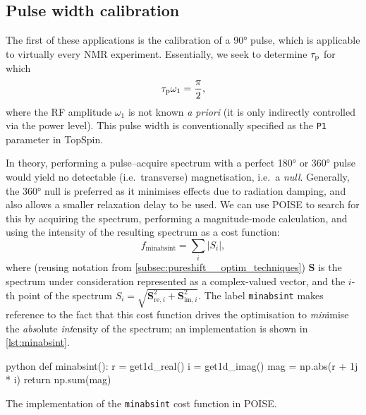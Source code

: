\subsection{Pulse width calibration}
\label{subsec:poise__pulsecal}

The first of these applications is the calibration of a \ang{90} \proton{} pulse, which is applicable to virtually every NMR experiment.
Essentially, we seek to determine $\tau_\mathrm{p}$ for which
\begin{equation}
    \label{eq:pw90}
    \tau_\mathrm{p} \omega_1 = \frac{\pi}{2},
\end{equation}
where the RF amplitude $\omega_1$ is not known \textit{a priori} (it is only indirectly controlled via the power level).
This pulse width is conventionally specified as the \texttt{P1} parameter in TopSpin.

In theory, performing a pulse--acquire spectrum with a perfect \ang{180} or \ang{360} pulse would yield no detectable (i.e.\ transverse) magnetisation, i.e.\ a \textit{null}.
Generally, the \ang{360} null is preferred as it minimises effects due to radiation damping, and also allows a smaller relaxation delay to be used.
We can use POISE to search for this by acquiring the spectrum, performing a magnitude-mode calculation, and using the intensity of the resulting spectrum as a cost function:
\begin{equation}
    \label{eq:minabsint}
    f_\mathrm{minabsint} = \sum_i |S_i|,
\end{equation}
where (reusing notation from \cref{subsec:pureshift__optim_techniques}) $\symbf{S}$ is the spectrum under consideration represented as a complex-valued vector, and the $i$-th point of the spectrum $S_i = \sqrt{\symbf{S}_{\text{re},i}^2 + \symbf{S}_{\text{im},i}^2}$.
The label \texttt{minabsint} makes reference to the fact that this cost function drives the optimisation to \textit{min}imise the \textit{abs}olute \textit{int}ensity of the spectrum; an implementation is shown in \cref{lst:minabsint}.

\begin{mylisting}[htb]
\begin{tcbminted}{python}
def minabsint():
    r = get1d_real()
    i = get1d_imag()
    mag = np.abs(r + 1j * i)
    return np.sum(mag)
\end{tcbminted}
\caption[\texttt{minabsint} cost function]{The implementation of the \texttt{minabsint} cost function in POISE.}
\label{lst:minabsint}
\end{mylisting}

